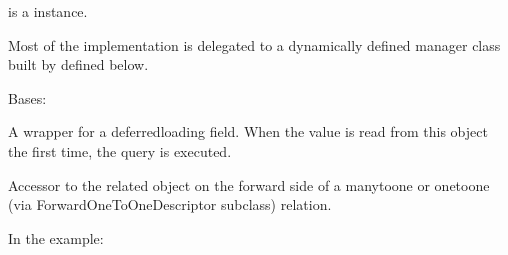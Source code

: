 \documentclass[letterpaper,10pt,english]{sphinxmanual}
\begin{document}
\begin{fulllineitems}
\begin{fulllineitems}
\sphinxAtStartPar
{} is a  instance.

\sphinxAtStartPar
Most of the implementation is delegated to a dynamically defined manager
class built by  defined below.

\end{fulllineitems}


\begin{fulllineitems}
\label{\detokenize{app:app.models.association.MultipleObjectsReturned}}
\pysigstartsignatures
{}
\pysigstopsignatures
\sphinxAtStartPar
Bases: 

\end{fulllineitems}


\begin{fulllineitems}
\label{\detokenize{app:app.models.association.id}}
\pysigstartsignatures
{}
\pysigstopsignatures
\sphinxAtStartPar
A wrapper for a deferred\sphinxhyphen{}loading field. When the value is read from this
object the first time, the query is executed.

\end{fulllineitems}


\begin{fulllineitems}
\label{\detokenize{app:app.models.association.interface}}
\pysigstartsignatures
{}
\pysigstopsignatures
\sphinxAtStartPar
Accessor to the related object on the forward side of a many\sphinxhyphen{}to\sphinxhyphen{}one or
one\sphinxhyphen{}to\sphinxhyphen{}one (via ForwardOneToOneDescriptor subclass) relation.

\sphinxAtStartPar
In the example:

\begin{sphinxVerbatim}[commandchars=\\\{\}]
 
       
\end{sphinxVerbatim}


\end{fulllineitems}
\end{fulllineitems}
\end{document}
